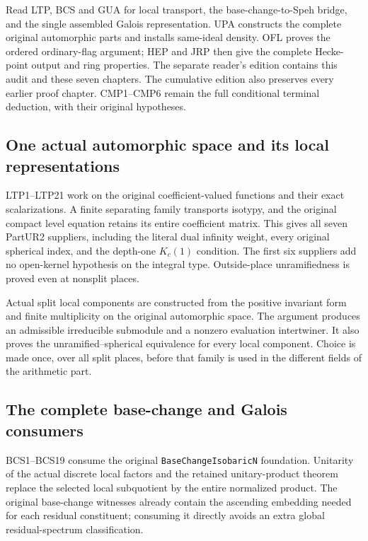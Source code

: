 \documentclass[11pt,a4paper]{article}
\numberwithin{equation}{section}
\theoremstyle{remark}\newtheorem{remark}[theorem]{Remark}
\begin{document}
Read LTP, BCS and GUA for local transport, the base-change-to-Speh
bridge, and the single assembled Galois representation.  UPA
constructs the complete original automorphic parts and installs
same-ideal density.  OFL proves the ordered ordinary-flag argument;
HEP and JRP then give the complete Hecke-point output and ring
properties.  The separate reader's edition contains this audit and
these seven chapters.  The cumulative edition also preserves every
earlier proof chapter.  CMP1--CMP6 remain the full conditional
terminal deduction, with their original hypotheses.

\subsection{One actual automorphic space and its local representations}

LTP1--LTP21 work on the original coefficient-valued functions and
their exact scalarizations.  A finite separating family transports
isotypy, and the original compact level equation retains its entire
coefficient matrix.  This gives all seven PartUR2 suppliers,
including the literal dual infinity weight, every original
spherical index, and the depth-one $K_c(1)$ condition.
The first six suppliers add no open-kernel hypothesis on the
integral type.  Outside-place unramifiedness is proved even at
nonsplit places.

Actual split local components are constructed from the positive
invariant form and finite multiplicity on the original automorphic
space.  The argument produces an admissible irreducible submodule
and a nonzero evaluation intertwiner.  It also proves the
unramified--spherical equivalence for every local component.
Choice is made once, over all split places, before that family is
used in the different fields of the arithmetic part.

\subsection{The complete base-change and Galois consumers}

BCS1--BCS19 consume the original
\texttt{Base\allowbreak Change\allowbreak Isobaric\allowbreak N} foundation.  Unitarity of the actual
discrete local factors and the retained unitary-product theorem
replace the selected local subquotient by the entire normalized
product.  The original base-change witnesses already contain the
ascending embedding needed for each residual constituent; consuming
it directly avoids an extra global residual-spectrum classification.
\end{document}
